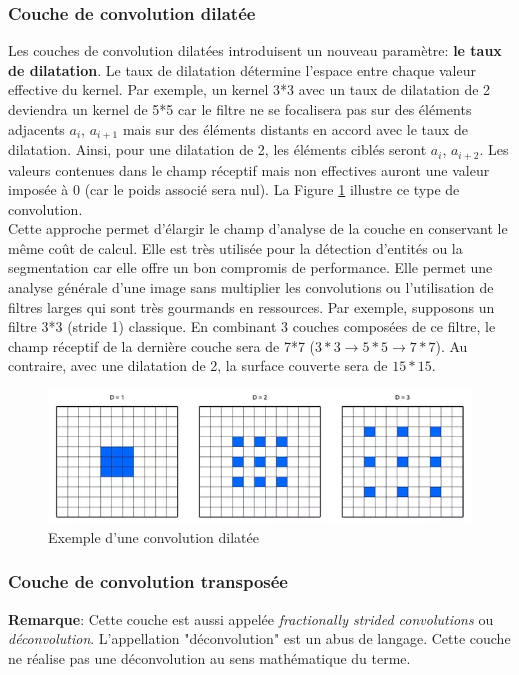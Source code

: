\subsubsection{Couche de convolution dilatée}
Les couches de convolution dilatées\cite{dilate} introduisent un nouveau paramètre: \textbf{le taux de dilatation}. Le taux de dilatation détermine l'espace entre chaque valeur effective du kernel. Par exemple, un kernel 3*3 avec un taux de dilatation de 2 deviendra un kernel de 5*5 car le filtre ne se focalisera pas sur des éléments adjacents $a_i$, $a_{i+1}$ mais sur des éléments distants en accord avec le taux de dilatation. Ainsi, pour une dilatation de 2, les éléments ciblés seront $a_i$, $a_{i+2}$. Les valeurs contenues dans le champ réceptif mais non effectives auront une valeur imposée à 0 (car le poids associé sera nul). La Figure \ref{dilate} illustre ce type de convolution.\\

\noindent Cette approche permet d'élargir le champ d'analyse de la couche en conservant le même coût de calcul. Elle est très utilisée pour la détection d'entités ou la segmentation car elle offre un bon compromis de performance. Elle permet une analyse générale d'une image sans multiplier les convolutions ou l'utilisation de filtres larges qui sont très gourmands en ressources. Par exemple, supposons un filtre 3*3 (stride 1) classique. En combinant 3 couches composées de ce filtre, le champ réceptif de la dernière couche sera de 7*7 ($3*3 \rightarrow 5*5 \rightarrow 7*7$). Au contraire, avec une dilatation de 2, la surface couverte sera de $15*15$.

\begin{figure}
    \centering
    \includegraphics[scale=0.4]{./tex/convolution-network/cnn/dilated.png}
    \caption{Exemple d'une convolution dilatée}
    \label{dilate}
\end{figure}

\subsubsection{Couche de convolution transposée}
\textbf{Remarque}: Cette couche est aussi appelée \textit{fractionally strided convolutions} ou \textit{déconvolution}. L'appellation "déconvolution" est un abus de langage. Cette couche ne réalise pas une déconvolution au sens mathématique du terme.\\

